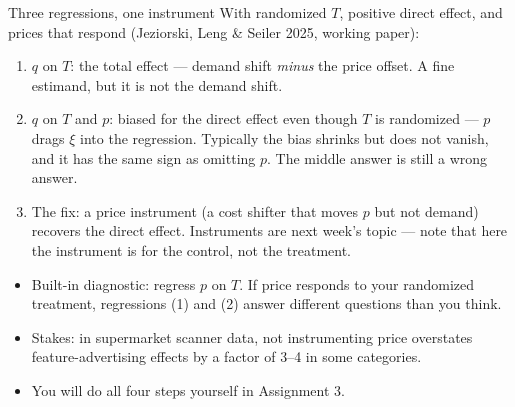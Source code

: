 \documentclass[aspectratio=169,11pt]{beamer}
\begin{document}
\begin{frame}{Three regressions, one instrument}
With randomized $T$, positive direct effect, and prices that respond
(Jeziorski, Leng \& Seiler 2025, working paper):
\begin{enumerate}
	\item $q$ on $T$: the \alert{total} effect --- demand shift \emph{minus} the price
	offset. A fine estimand, but it is not the demand shift.

	\item $q$ on $T$ and $p$: \alert{biased for the direct effect even though $T$ is
	randomized} --- $p$ drags $\xi$ into the regression. Typically the bias shrinks
	but does not vanish, and it has the same sign as omitting $p$. The middle answer
	is still a wrong answer.

	\item The fix: a \alert{price instrument} (a cost shifter that moves $p$ but not
	demand) recovers the direct effect. Instruments are next week's topic --- note
	that here the instrument is for the \alert{control}, not the treatment.
\end{enumerate}
\medskip
\begin{itemize}
	\item Built-in diagnostic: regress $p$ on $T$. If price responds to your
	randomized treatment, regressions (1) and (2) answer different questions than
	you think.
	\item Stakes: in supermarket scanner data, not instrumenting price overstates
	feature-advertising effects by a factor of 3--4 in some categories.
	\item You will do all four steps yourself in Assignment 3.
\end{itemize}
\end{frame}
\end{document}
